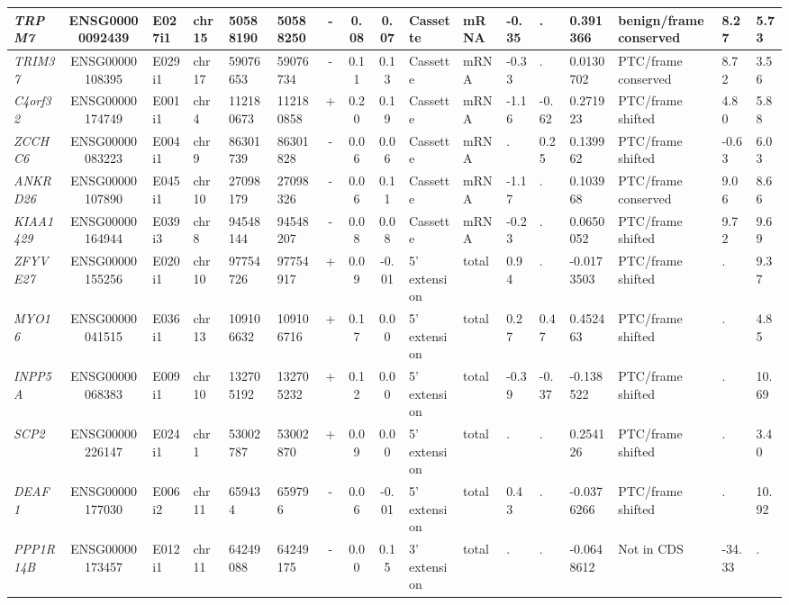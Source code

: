 \begin{appendices}
\begin{landscape}
\begin{table}
{\begin{tabular}{|l|c|l|l|l|l|c|c|c|l|l|l|l|l|l|l|l|}
		\textit{TRPM7} & ENSG00000092439 & E027i1 & chr15 & 50588190 & 50588250 & -     & 0.08  & 0.07  & Cassette & mRNA  & -0.35 & . & 0.391366 & benign/frame conserved & 8.27  &  5.73 \\ \hline
		\textit{TRIM37} & ENSG00000108395 & E029i1 & chr17 & 59076653 & 59076734 & -     & 0.11  & 0.13  & Cassette & mRNA  & -0.33 & . & 0.0130702 & PTC/frame conserved & 8.72  &  3.56 \\ \hline
		\textit{C4orf32} & ENSG00000174749 & E001i1 & chr4  & 112180673 & 112180858 & +     & 0.20  & 0.19  & Cassette & mRNA  & -1.16 & -0.62 & 0.271923 & PTC/frame shifted & 4.80  &  5.88 \\ \hline
		\textit{ZCCHC6} & ENSG00000083223 & E004i1 & chr9  & 86301739 & 86301828 & -     & 0.06  & 0.06  & Cassette & mRNA  & . & 0.25  & 0.139962 & PTC/frame shifted & -0.63 &  6.03 \\ \hline
		\textit{ANKRD26} & ENSG00000107890 & E045i1 & chr10 & 27098179 & 27098326 & -     & 0.06  & 0.11  & Cassette & mRNA  & -1.17 & . & 0.103968 & PTC/frame conserved & 9.06  &  8.66 \\ \hline
		\textit{KIAA1429} & ENSG00000164944 & E039i3 & chr8  & 94548144 & 94548207 & -     & 0.08  & 0.08  & Cassette & mRNA  & -0.23 & . & 0.0650052 & PTC/frame shifted & 9.72  &  9.69 \\ \hline
		\textit{ZFYVE27} & ENSG00000155256 & E020i1 & chr10 & 97754726 & 97754917 & +     & 0.09  & -0.01 & 5' extension & total & 0.94  & . & -0.0173503 & PTC/frame shifted & . &  9.37 \\ \hline
		\textit{MYO16} & ENSG00000041515 & E036i1 & chr13 & 109106632 & 109106716 & +     & 0.17  & 0.00  & 5' extension & total & 0.27  & 0.47  & 0.452463 & PTC/frame shifted & . &  4.85 \\ \hline
		\textit{INPP5A} & ENSG00000068383 & E009i1 & chr10 & 132705192 & 132705232 & +     & 0.12  & 0.00  & 5' extension & total & -0.39 & -0.37 & -0.138522 & PTC/frame shifted & . &  10.69 \\ \hline
		\textit{SCP2} & ENSG00000226147 & E024i1 & chr1  & 53002787 & 53002870 & +     & 0.09  & 0.00  & 5' extension & total & . & . & 0.254126 & PTC/frame shifted & . &  3.40 \\ \hline
		\textit{DEAF1} & ENSG00000177030 & E006i2 & chr11 & 659434 & 659796 & -     & 0.06  & -0.01 & 5' extension & total & 0.43  & . & -0.0376266 & PTC/frame shifted & . &  10.92 \\ \hline
		\textit{PPP1R14B} & ENSG00000173457 & E012i1 & chr11 & 64249088 & 64249175 & -     & 0.00  & 0.15  & 3' extension & total & . & . & -0.0648612 & Not in CDS     & -34.33 & . \\ \hline

\end{tabular}}
\end{table}
\end{landscape}
\end{appendices}

